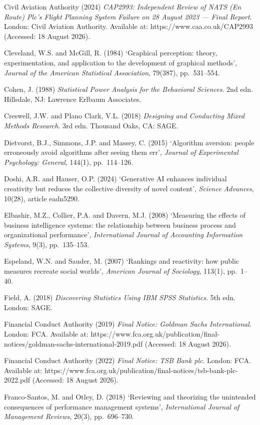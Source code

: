 \documentclass[11pt,a4paper]{article}
\numberwithin{figure}{section}
\numberwithin{table}{section}
\newcommand{\ct}[1]{\textcolor{citeblue}{#1}}          %
\begin{document}
{Civil Aviation Authority (2024) \emph{CAP2993: Independent Review of NATS (En Route) Plc's Flight
Planning System Failure on 28 August 2023 --- Final Report}. London: Civil Aviation Authority.
Available at: \ct{https://www.caa.co.uk/CAP2993} (Accessed: 18 August 2026).

Cleveland, W.S. and McGill, R. (1984) `Graphical perception: theory, experimentation, and
application to the development of graphical methods', \emph{Journal of the American Statistical
Association}, 79(387), pp.~531--554.

Cohen, J. (1988) \emph{Statistical Power Analysis for the Behavioral Sciences}. 2nd edn. Hillsdale,
NJ: Lawrence Erlbaum Associates.

Creswell, J.W. and Plano Clark, V.L. (2018) \emph{Designing and Conducting Mixed Methods Research}.
3rd edn. Thousand Oaks, CA: SAGE.

Dietvorst, B.J., Simmons, J.P. and Massey, C. (2015) `Algorithm aversion: people erroneously avoid
algorithms after seeing them err', \emph{Journal of Experimental Psychology: General}, 144(1),
pp.~114--126.

Doshi, A.R. and Hauser, O.P. (2024) `Generative AI enhances individual creativity but reduces the
collective diversity of novel content', \emph{Science Advances}, 10(28), article eadn5290.

Elbashir, M.Z., Collier, P.A. and Davern, M.J. (2008) `Measuring the effects of business
intelligence systems: the relationship between business process and organizational performance',
\emph{International Journal of Accounting Information Systems}, 9(3), pp.~135--153.

Espeland, W.N. and Sauder, M. (2007) `Rankings and reactivity: how public measures recreate social
worlds', \emph{American Journal of Sociology}, 113(1), pp.~1--40.

Field, A. (2018) \emph{Discovering Statistics Using IBM SPSS Statistics}. 5th edn. London: SAGE.

Financial Conduct Authority (2019) \emph{Final Notice: Goldman Sachs International}. London: FCA.
Available at: \ct{https://www.fca.org.uk/publication/final-notices/goldman-sachs-international-2019.pdf}
(Accessed: 18 August 2026).

Financial Conduct Authority (2022) \emph{Final Notice: TSB Bank plc}. London: FCA. Available at:
\ct{https://www.fca.org.uk/publication/final-notices/tsb-bank-plc-2022.pdf} (Accessed: 18 August 2026).

Franco-Santos, M. and Otley, D. (2018) `Reviewing and theorizing the unintended consequences of
performance management systems', \emph{International Journal of Management Reviews}, 20(3),
pp.~696--730.

}
\end{document}
